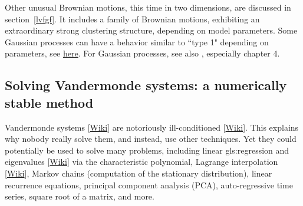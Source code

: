 \documentclass[oneside,10pt]{book}
\begin{document}
Other unusual Brownian motions, this time in two dimensions, are discussed in section~\ref{lvfgf}.  It includes a 
family of Brownian motions, exhibiting an extraordinary strong clustering structure, depending on model parameters.  Some Gaussian processes 
can have a behavior similar to ``type 1" depending on parameters, see \href{https://www.r-bloggers.com/2019/07/sampling-paths-from-a-gaussian-process/}{here}. For Gaussian processes, see also \cite{cras2006}, especially chapter 4.


\subsection{Solving Vandermonde systems: a numerically stable method}\label{vandervg}

\textcolor{index}{Vandermonde systems}  [\href{https://en.wikipedia.org/wiki/Vandermonde_matrix}{Wiki}] are notoriously 
\textcolor{index}{ill-conditioned} [\href{https://en.wikipedia.org/wiki/Condition_number}{Wiki}]. This explains why nobody really solve them, and instead, use other techniques. Yet they could potentially be used to solve many problems,
including linear \gls{gls:regression} and \textcolor{index}{eigenvalues} [\href{https://en.wikipedia.org/wiki/Eigenvalues_and_eigenvectors}{Wiki}] via
 the characteristic polynomial, \textcolor{index}{Lagrange interpolation} [\href{https://en.wikipedia.org/wiki/Runge\%27s_phenomenon}{Wiki}], Markov chains (computation of the \textcolor{index}{stationary distribution}), linear recurrence equations, principal component analysis (PCA), auto-regressive time series, square root of a matrix, and more.
\end{document}
